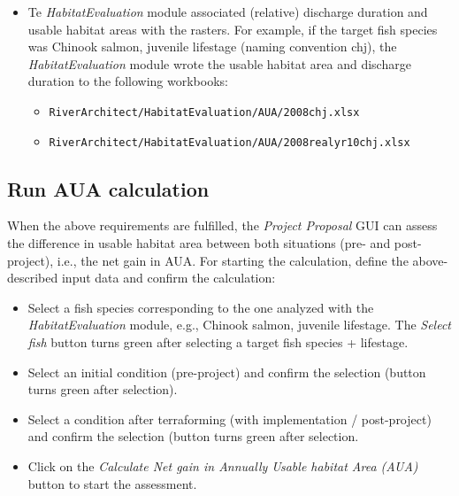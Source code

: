 \begin{itemize}
\begin{itemize}
    \begin{itemize}
    \item \texttt{RiverArchitect/HabitatEvaluation/AUA/Rasters/2008} (existing / pre-project)
    \item \texttt{RiverArchitect/HabitatEvaluation/AUA/Rasters/2008{\myUnderscore}rea{\myUnderscore}lyr10} (with implementation / post-project)
    \end{itemize}
  \item Te \emph{HabitatEvaluation} module associated (relative) discharge duration and usable habitat areas with the rasters. For example, if the target fish species was Chinook salmon, juvenile lifestage (naming convention chj), the \emph{HabitatEvaluation} module wrote the usable habitat area and discharge duration to the following workbooks:
    \begin{itemize}
    \item \texttt{RiverArchitect/HabitatEvaluation/AUA/2008{\myUnderscore}chj.xlsx}
    \item \texttt{RiverArchitect/HabitatEvaluation/AUA/2008{\myUnderscore}rea{\myUnderscore}lyr10{\myUnderscore}chj.xlsx}
    \end{itemize}
  \end{itemize}
\end{itemize}

\subsection{Run AUA calculation}
When the above requirements are fulfilled, the \emph{Project Proposal} GUI can assess the difference in usable habitat area between both situations (pre- and post-project), i.e., the net gain in AUA. For starting the calculation, define the above-described input data and confirm the calculation:
\begin{itemize}
\item Select a fish species corresponding to the one analyzed with the \emph{HabitatEvaluation} module, e.g., Chinook salmon, juvenile lifestage. The \emph{Select fish} button turns green after selecting a target fish species + lifestage.
\item Select an initial condition (pre-project) and confirm the selection (button turns green after selection).
\item Select a condition after terraforming (with implementation / post-project) and confirm the selection (button turns green after selection.
\item Click on the \emph{Calculate Net gain in Annually Usable habitat Area (AUA)} button to start the assessment.
\end{itemize}

